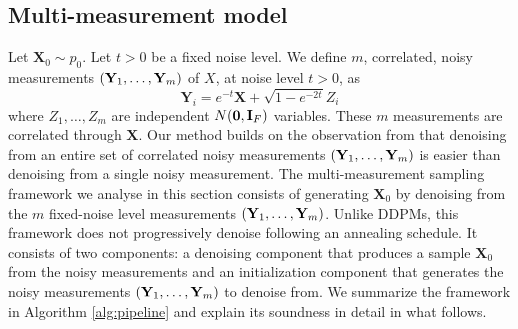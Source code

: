\subsection{Multi-measurement model}
Let $\mathbf{X}_0 \sim p_0$. Let $t>0$ be a fixed noise level. We define $m$, correlated, noisy measurements $\mathopen{}\left(\mathbf{Y}_1, \dots, \mathbf{Y}_m\right)$ of $X$, at noise level $t >0$, as
\begin{equation}
\mathbf{Y}_i = e^{-t} \mathbf{X} + \sqrt{1 - e^{-2t}} Z_i
\label{eq:multimeasure}
\end{equation}
where $Z_1, \dots, Z_m$ are independent $N\mathopen{}\left(\mathbf{0}, \mathbf{I}_F\right)$ variables. These $m$ measurements are correlated through $\mathbf{X}$. Our method builds on the observation from \cite{saremi_multimeasurement_2022} that denoising from an entire set of correlated noisy measurements $\mathopen{}\left(\mathbf{Y}_1, \dots, \mathbf{Y}_m\right)$ is easier than denoising from a single noisy measurement. The multi-measurement sampling framework we analyse in this section consists of generating $\mathbf{X}_0$ by denoising from the $m$ fixed-noise level measurements $\mathopen{}\left(\mathbf{Y}_1, \dots, \mathbf{Y}_m\right)$. Unlike DDPMs, this framework does not progressively denoise following an annealing schedule. It consists of two components: a denoising component that produces a sample $\mathbf{X}_0$ from the noisy measurements and an initialization component that generates the noisy measurements $\mathopen{}\left(\mathbf{Y}_1, \dots, \mathbf{Y}_m\right)$ to denoise from. We summarize the framework in Algorithm \ref{alg:pipeline} and explain its soundness in detail in what follows.

\begin{algorithm}[H]
\caption{Gibbs Multi-measurement Sampling Framework}
\label{alg:pipeline}
\begin{algorithmic}
\ENDFOR
{}
\end{algorithmic}
\end{algorithm}

